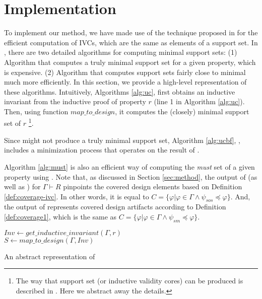 \section{Implementation}
\label{sec:impl}

To implement our method, we have made use of the technique proposed in \cite{Ghass16} for the efficient computation of IVCs, which are the same as elements of a support set. In \cite{Ghass16}, there are two detailed algorithms for computing minimal support sets: (1) Algorithm \ucbfalg that computes a truly minimal support set for a given property, which is expensive. (2) Algorithm \ucalg that computes support sets fairly close to minimal much more efficiently. In this section, we provide a high-level representation of these algorithms. Intuitively, Algorithms \ref{alg:uc},
first obtains an inductive invariant from the inductive proof of
property $r$ (line 1 in Algorithm \ref{alg:uc}). Then, using function $map\_to\_design$, it
computes the (closely) minimal support set of $r$ \footnote{The way that support set
(or inductive validity cores) can be produced is described in \cite{Ghass16}. Here we abstract away the details.}.

Since \ucalg might not produce a truly minimal support set,
Algorithm \ref{alg:ucbf}, \ucbfalg, includes a minimization process that
operates on the result of \ucalg.

Algorithm \ref{alg:must} is also an efficient way of computing the \emph{must} set of a given property using \ucalg. Note that, as discussed in Section \ref{sec:method}, the
output of \ucalg (as well as \ucbfalg) for $\Gamma \vdash R$ pinpoints the covered design elements
based on Definition \ref{def:coverage-ivc}.
In other words, it is equal to
$C = \{\varphi | \varphi \in \Gamma \wedge  \psi_{sos} \preccurlyeq \varphi \}$.
And, the output of \mustalg represents covered design artifacts according to Definition \ref{def:coverage1}, which is the same as $C = \{\varphi | \varphi \in \Gamma \wedge \psi_{sm} \preccurlyeq \varphi \}$.

\begin{algorithm}
  \BlankLine
  $Inv \leftarrow get\_inductive\_invariant(\Gamma, r)$ \\
  $S \leftarrow map\_to\_design (\Gamma, Inv)$ \\
\caption{An abstract representation of \ucalg \cite{Ghass16}}
\label{alg:uc}
\end{algorithm}

